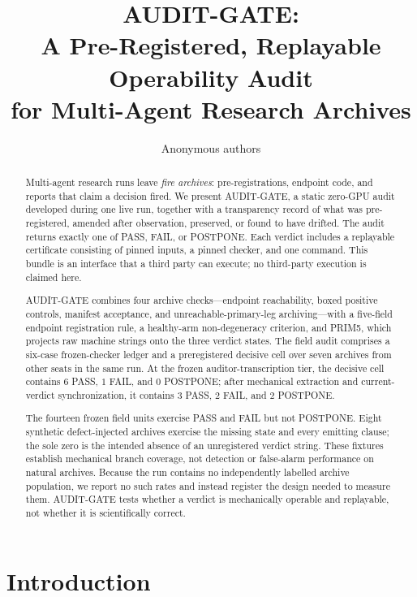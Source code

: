 \documentclass{article}
\title{AUDIT-GATE:\\
A Pre-Registered, Replayable Operability Audit\\
for Multi-Agent Research Archives}
\author{Anonymous authors}
\begin{document}
\raggedbottom

\maketitle

\begin{abstract}
Multi-agent research runs leave \emph{fire archives}: pre-registrations, endpoint code,
and reports that claim a decision fired.  We present AUDIT-GATE, a static zero-GPU audit
developed during one live run, together with a transparency record of what was
pre-registered, amended after observation, preserved, or found to have drifted.  The audit
returns exactly one of PASS, FAIL, or POSTPONE.  Each verdict includes a replayable
certificate consisting of pinned inputs, a pinned checker, and one command.  This bundle is
an interface that a third party can execute; no third-party execution is claimed here.

AUDIT-GATE combines four archive checks---endpoint reachability, boxed positive controls,
manifest acceptance, and unreachable-primary-leg archiving---with a five-field endpoint
registration rule, a healthy-arm non-degeneracy criterion, and PRIM5, which projects raw
machine strings onto the three verdict states.  The field audit comprises a six-case
frozen-checker ledger and a preregistered decisive cell over seven archives from other seats
in the same run.  At the frozen auditor-transcription tier, the decisive cell contains $6$
PASS, $1$ FAIL, and $0$ POSTPONE; after mechanical extraction and current-verdict
synchronization, it contains $3$ PASS, $2$ FAIL, and $2$ POSTPONE.

The fourteen frozen field units exercise PASS and FAIL but not POSTPONE.  Eight synthetic
defect-injected archives exercise the missing state and every emitting clause; the sole
zero is the intended absence of an unregistered verdict string.  These fixtures establish
mechanical branch coverage, not detection or false-alarm performance on natural archives.
Because the run contains no independently labelled archive population, we report no such
rates and instead register the design needed to measure them.  AUDIT-GATE tests whether a
verdict is mechanically operable and replayable, not whether it is scientifically correct.
\end{abstract}

\section{Introduction}
\label{sec:intro}
\end{document}
